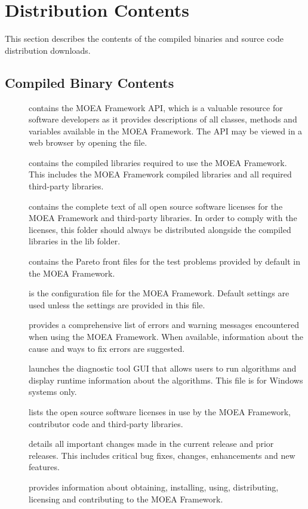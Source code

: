\section{Distribution Contents}
This section describes the contents of the compiled binaries and source code distribution downloads.

\subsection{Compiled Binary Contents}
\begin{description}
  \item[] contains the MOEA Framework API, which is a valuable resource for software developers as it provides descriptions of all classes, methods and variables available in the MOEA Framework.  The API may be viewed in a web browser by opening the  file.
  \item[] contains the compiled libraries required to use the MOEA Framework.  This includes the MOEA Framework compiled libraries and all required third-party libraries.
  \item[] contains the complete text of all open source software licenses for the MOEA Framework and third-party libraries.  In order to comply with the licenses, this folder should always be distributed alongside the compiled libraries in the lib folder.
  \item[] contains the Pareto front files for the test problems provided by default in the MOEA Framework.
  \item[] is the configuration file for the MOEA Framework.  Default settings are used unless the settings are provided in this file.
  \item[] provides a comprehensive list of errors and warning messages encountered when using the MOEA Framework.  When available, information about the cause and ways to fix errors are suggested.
  \item[] launches the diagnostic tool GUI that allows users to run algorithms and display runtime information about the algorithms.  This file is for Windows systems only.
  \item[] lists the open source software licenses in use by the MOEA Framework, contributor code and third-party libraries.
  \item[] details all important changes made in the current release and prior releases.  This includes critical bug fixes, changes, enhancements and new features.
  \item[] provides information about obtaining, installing, using, distributing, licensing and contributing to the MOEA Framework.
\end{description}

